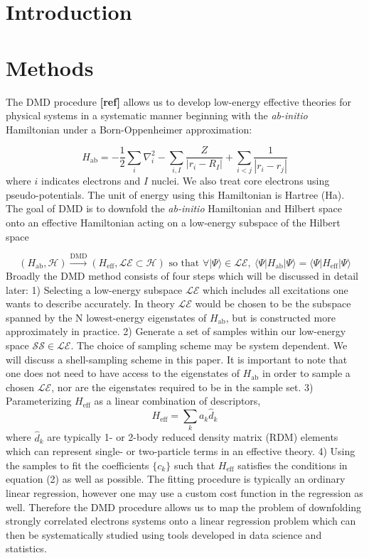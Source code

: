 \documentclass{article}
\begin{document}
\section{Introduction}

\section{Methods}
The DMD procedure \textbf{[ref]} allows us to develop low-energy effective theories for physical systems in a systematic manner beginning with the \textit{ab-initio} Hamiltonian under a Born-Oppenheimer approximation:

\begin{equation}
H_\text{ab} = -\frac{1}{2} \sum_{i} \nabla_i^2 - \sum_{i,I}\frac{Z}{|r_i - R_I|} + \sum_{i<j}\frac{1}{|r_i - r_j|}
\end{equation}
where $i$ indicates electrons and $I$ nuclei. We also treat core electrons using pseudo-potentials. 
The unit of energy using this Hamiltonian is Hartree (Ha). 
The goal of DMD is to downfold the \textit{ab-initio} Hamiltonian and Hilbert space onto an effective Hamiltonian acting on a low-energy subspace of the Hilbert space 

\begin{equation}
(H_\text{ab}, \mathcal{H}) \xrightarrow{\text{DMD}} (H_\text{eff}, \mathcal{LE} \subset \mathcal{H}) \text{ so that }
\forall |\Psi\rangle \in \mathcal{LE}, \ \langle \Psi | H_\text{ab} | \Psi\rangle = \langle \Psi | H_\text{eff} | \Psi\rangle
\end{equation} 
Broadly the DMD method consists of four steps which will be discussed in detail later: 1) Selecting a low-energy subspace $\mathcal{LE}$ which includes all excitations one wants to describe accurately. 
In theory $\mathcal{LE}$ would be chosen to be the subspace spanned by the N lowest-energy eigenstates of $H_\text{ab}$, but is constructed more approximately in practice.  
2) Generate a set of samples within our low-energy space $\mathcal{SS} \in \mathcal{LE}$. 
The choice of sampling scheme may be system dependent. 
We will discuss a shell-sampling scheme in this paper. 
It is important to note that one does not need to have access to the eigenstates of $H_\text{ab}$ in order to sample a chosen $\mathcal{LE}$, nor are the eigenstates required to be in the sample set.
3) Parameterizing $H_\text{eff}$ as a linear combination of descriptors, 
\begin{equation}
H_\text{eff} = \sum_k a_k \hat{d}_k
\end{equation}
where $\hat{d}_k$ are typically 1- or 2-body reduced density matrix (RDM) elements which can represent single- or two-particle terms in an effective theory.
4) Using the samples to fit the coefficients $\{c_k\}$ such that $H_\text{eff}$ satisfies the conditions in equation (2) as well as possible. 
The fitting procedure is typically an ordinary linear regression, however one may use a custom cost function in the regression as well. 
Therefore the DMD procedure allows us to map the problem of downfolding strongly correlated electrons systems onto a linear regression problem which can then be systematically studied using tools developed in data science and statistics.
\end{document}
